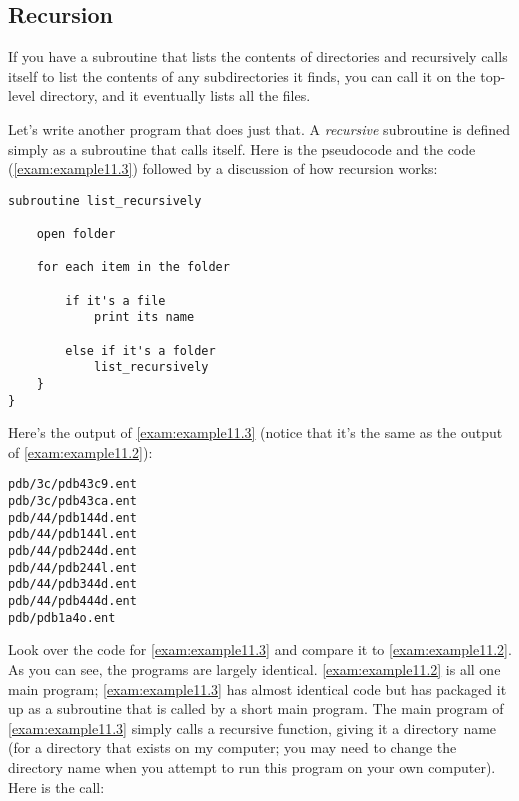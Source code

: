 \subsection{Recursion}
If you have a subroutine that lists the contents of directories and recursively calls itself to list the contents of any subdirectories it finds, you can call it on the top-level directory, and it eventually lists all the files.

Let's write another program that does just that. A \textit{recursive} subroutine is defined simply as a subroutine that calls itself. Here is the pseudocode and the code (\autoref{exam:example11.3}) followed by a discussion of how recursion works: 

\begin{lstlisting}
subroutine list_recursively

    open folder

    for each item in the folder

        if it's a file
            print its name

        else if it's a folder
            list_recursively
    }
}
\end{lstlisting}



Here's the output of \autoref{exam:example11.3} (notice that it's the same as the output of \autoref{exam:example11.2}): 

\begin{lstlisting}
pdb/3c/pdb43c9.ent
pdb/3c/pdb43ca.ent
pdb/44/pdb144d.ent
pdb/44/pdb144l.ent
pdb/44/pdb244d.ent
pdb/44/pdb244l.ent
pdb/44/pdb344d.ent
pdb/44/pdb444d.ent
pdb/pdb1a4o.ent
\end{lstlisting}

Look over the code for \autoref{exam:example11.3} and compare it to \autoref{exam:example11.2}. As you can see, the programs are largely identical. \autoref{exam:example11.2} is all one main program; \autoref{exam:example11.3} has almost identical code but has packaged it up as a subroutine that is called by a short main program. The main program of \autoref{exam:example11.3} simply calls a recursive function, giving it a directory name (for a directory that exists on my computer; you may need to change the directory name when you attempt to run this program on your own computer). Here is the call:

